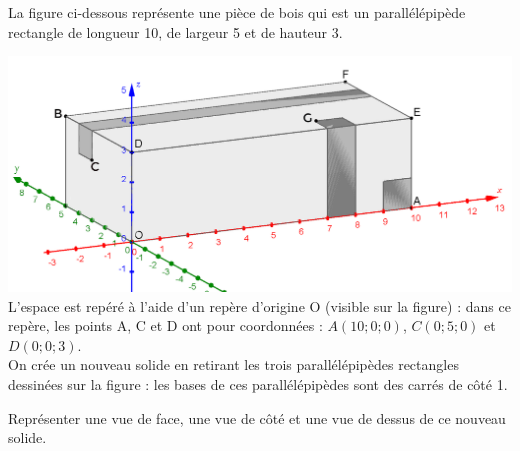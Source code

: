 
La figure ci-dessous représente une pièce de bois qui est un parallélépipède rectangle de
longueur 10, de largeur 5 et de hauteur 3.

\includegraphics[scale=0.25]{RepE-parallelepipedecoordonnees.png}\\ 

L’espace est repéré à l’aide d’un repère d’origine O (visible sur la figure) : dans ce repère, les
points A, C et D ont pour coordonnées : $A (10 ; 0 ; 0)$, $C (0 ; 5 ; 0)$ et $D (0 ; 0 ; 3)$.\\

On crée un nouveau solide en retirant les trois parallélépipèdes rectangles dessinées sur la
figure : les bases de ces parallélépipèdes sont des carrés de côté 1.

\medskip

Représenter une vue de face, une vue de côté et une vue de dessus de ce nouveau solide.

